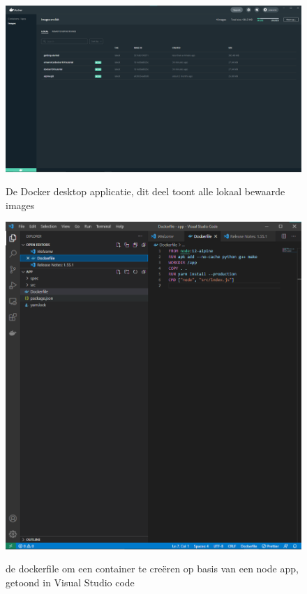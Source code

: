 \begin{figure}[h]
    \includegraphics[width=\linewidth]{img/dockerImg.png}
    \label{fig:Dockerdesktop}
    \caption[De Docker desktop applicatie]{De Docker desktop applicatie, dit deel toont alle lokaal bewaarde images}
    \centering
\end{figure}
\begin{figure}[h]
    \includegraphics[width=\linewidth]{img/dockerSample.png}
    \label{fig:dockerfilevscode}
    \caption[Een dockerfile in VS code]{de dockerfile om een container  te creëren op basis van een node app, getoond in Visual Studio code}
    \centering
\end{figure}


